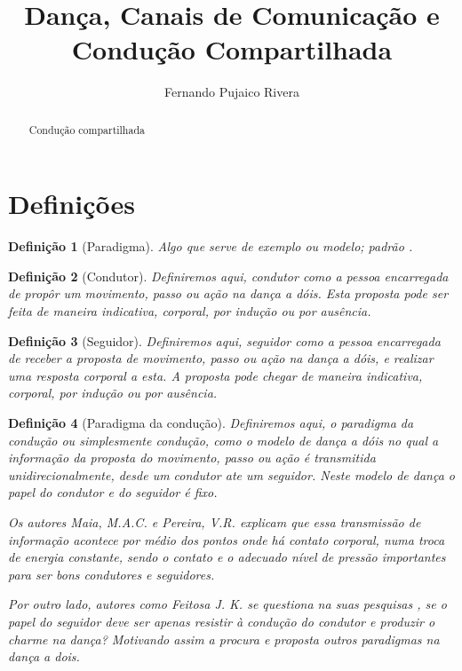 \documentclass[a4paper,10pt]{article}
\title{Dança, Canais de Comunicação e Condução Compartilhada}
\author{Fernando Pujaico Rivera}
\newtheorem{mydef}{Definição}
\begin{document}
\maketitle

\begin{abstract}
Condução compartilhada
\end{abstract}
\section{Definições}

\begin{mydef}[Paradigma]
Algo que serve de exemplo ou modelo; padrão \cite{michaelis.uol.com.br}.
\end{mydef}

\begin{mydef}[Condutor]
Definiremos aqui, condutor como a pessoa encarregada de propôr um movimento, passo ou ação na dança a dóis.
Esta proposta pode ser feita de maneira indicativa, corporal, por indução ou por ausência.
\end{mydef}

\begin{mydef}[Seguidor]
Definiremos aqui, seguidor como a pessoa encarregada de  receber a proposta de movimento, passo ou ação  na dança a dóis,
e realizar uma resposta corporal a esta.
A proposta pode chegar de maneira indicativa, corporal, por indução ou por ausência.
\end{mydef}

\begin{mydef}[Paradigma da condução]
Definiremos aqui, o paradigma da condução ou simplesmente condução, como o modelo de dança a dóis no qual a informação da proposta do movimento, 
passo ou ação é transmitida unidirecionalmente, 
desde um condutor ate um seguidor.
Neste modelo de dança o papel do condutor e do seguidor é fixo.


Os autores Maia, M.A.C. e Pereira, V.R. \cite{maia2010danca} explicam que 
essa transmissão de informação acontece por médio dos pontos onde há contato corporal, numa troca de energia constante,
sendo o contato e o adecuado nível de pressão importantes para ser bons condutores e seguidores.

Por outro lado, autores como Feitosa J. K. se questiona na suas pesquisas \cite[pp. 24]{Jonas2011},
se o papel do seguidor deve ser apenas resistir à condução do condutor e produzir o charme na dança?
Motivando assim a procura e proposta outros paradigmas na dança a dois.

\end{mydef}
\end{document}
